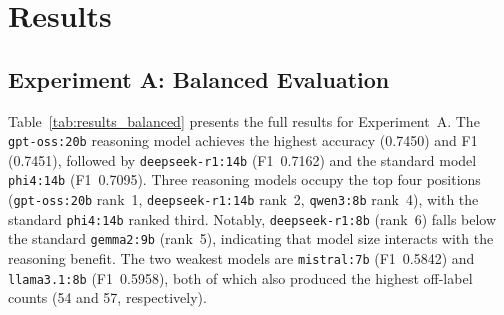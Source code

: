 \documentclass[journal]{IEEEtran}
\begin{document}
\section{Results}
\label{sec:results}

\subsection{Experiment A: Balanced Evaluation}

Table~\ref{tab:results_balanced} presents the full results for
Experiment~A. The \texttt{gpt-oss:20b} reasoning model achieves the
highest accuracy (0.7450) and F1 (0.7451), followed by
\texttt{deepseek-r1:14b} (F1~0.7162) and the standard model
\texttt{phi4:14b} (F1~0.7095). Three reasoning models occupy the top four
positions (\texttt{gpt-oss:20b} rank~1, \texttt{deepseek-r1:14b}
rank~2, \texttt{qwen3:8b} rank~4), with the standard
\texttt{phi4:14b} ranked third. Notably,
\texttt{deepseek-r1:8b} (rank~6) falls below the standard
\texttt{gemma2:9b} (rank~5), indicating that model size interacts
with the reasoning benefit. The two weakest models are
\texttt{mistral:7b} (F1~0.5842) and \texttt{llama3.1:8b}
(F1~0.5958), both of which also produced the highest off-label
counts (54 and 57, respectively).

\begin{table}[!t]
  \renewcommand{\arraystretch}{1.3}
  \caption{Experiment A Results — Balanced ($N = 1{,}000$)}
  \label{tab:results_balanced}
  \centering
  \scriptsize
  \setlength{\tabcolsep}{2pt}
\end{table}
\end{document}
